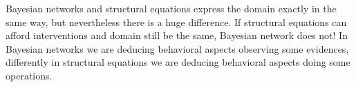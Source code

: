 Bayesian networks and structural equations express the domain exactly in the same way, but nevertheless there is a huge difference. If structural equations can afford interventions 
and domain still be the same, Bayesian network does not! In Bayesian networks we are deducing behavioral aspects observing some evidences, differently in structural equations 
we are deducing behavioral aspects doing some operations.